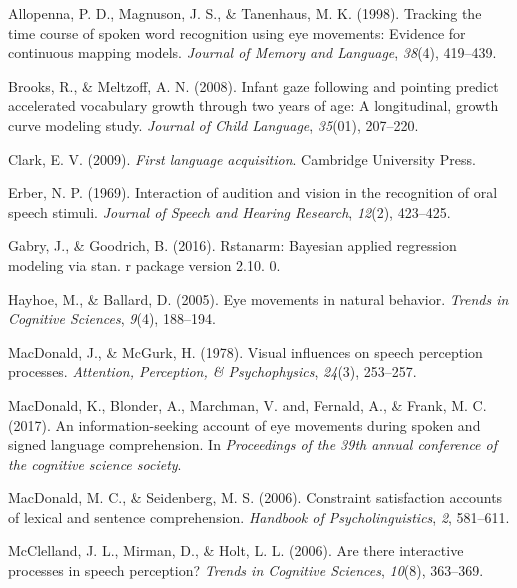 \documentclass[10pt, letterpaper]{article}
\begin{document}
\setlength{\parindent}{-0.1in} \setlength{\leftskip}{0.125in} \noindent

\hypertarget{refs}{}
\hypertarget{ref-allopenna1998tracking}{}
Allopenna, P. D., Magnuson, J. S., \& Tanenhaus, M. K. (1998). Tracking
the time course of spoken word recognition using eye movements: Evidence
for continuous mapping models. \emph{Journal of Memory and Language},
\emph{38}(4), 419--439.

\hypertarget{ref-brooks2008infant}{}
Brooks, R., \& Meltzoff, A. N. (2008). Infant gaze following and
pointing predict accelerated vocabulary growth through two years of age:
A longitudinal, growth curve modeling study. \emph{Journal of Child
Language}, \emph{35}(01), 207--220.

\hypertarget{ref-clark2009first}{}
Clark, E. V. (2009). \emph{First language acquisition}. Cambridge
University Press.

\hypertarget{ref-erber1969interaction}{}
Erber, N. P. (1969). Interaction of audition and vision in the
recognition of oral speech stimuli. \emph{Journal of Speech and Hearing
Research}, \emph{12}(2), 423--425.

\hypertarget{ref-gabry2016rstanarm}{}
Gabry, J., \& Goodrich, B. (2016). Rstanarm: Bayesian applied regression
modeling via stan. r package version 2.10. 0.

\hypertarget{ref-hayhoe2005eye}{}
Hayhoe, M., \& Ballard, D. (2005). Eye movements in natural behavior.
\emph{Trends in Cognitive Sciences}, \emph{9}(4), 188--194.

\hypertarget{ref-macdonald1978visual}{}
MacDonald, J., \& McGurk, H. (1978). Visual influences on speech
perception processes. \emph{Attention, Perception, \& Psychophysics},
\emph{24}(3), 253--257.

\hypertarget{ref-macdonald2017info}{}
MacDonald, K., Blonder, A., Marchman, V. and, Fernald, A., \& Frank, M.
C. (2017). An information-seeking account of eye movements during spoken
and signed language comprehension. In \emph{Proceedings of the 39th
annual conference of the cognitive science society}.

\hypertarget{ref-macdonald2006constraint}{}
MacDonald, M. C., \& Seidenberg, M. S. (2006). Constraint satisfaction
accounts of lexical and sentence comprehension. \emph{Handbook of
Psycholinguistics}, \emph{2}, 581--611.

\hypertarget{ref-mcclelland2006there}{}
McClelland, J. L., Mirman, D., \& Holt, L. L. (2006). Are there
interactive processes in speech perception? \emph{Trends in Cognitive
Sciences}, \emph{10}(8), 363--369.
\end{document}
